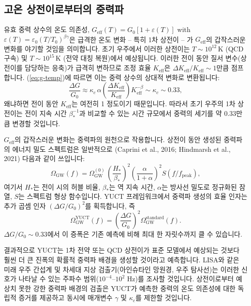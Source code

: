 \documentclass[11pt,a4paper]{article}
\newcommand{\Keff}{K_{\mathrm{eff}}}
\newcommand{\eps}{\varepsilon}
\begin{document}
	\subsection{고온 상전이로부터의 중력파}
	\label{subsec:gw}
	
	유효 중력 상수의 온도 의존성, $G_{\mathrm{eff}}(T)=G_0[1+\eps(T)]$ with $\eps(T)=\eps_0(T/T_0)^{\beta\gamma}$은 급격한 온도 변화 – 특히 1차 상전이 – 가 $G_{\mathrm{eff}}$의 갑작스러운 변화를 야기할 것임을 의미합니다. 초기 우주에서 이러한 상전이는 $T\sim 10^{12}\,\mathrm{K}$ (QCD 구속) 및 $T\sim 10^{15}\,\mathrm{K}$ (전약 대칭 복원)에서 예상됩니다. 이러한 전이 동안 질서 변수(상전이를 담당하는 응축)가 급격히 변하므로 조정 효율 $\Keff$은 $\Delta\Keff/\Keff\sim 1$만큼 점프합니다. (\ref{eq:g-temp})에 따르면 이는 중력 상수의 상대적 변화로 변환됩니다:
	\begin{equation}
		\frac{\Delta G}{G_0} \approx \kappa_c\,\alpha \left(\frac{\Delta\Keff}{\Keff}\right) 
		\Keff^{-\beta} \sim \kappa_c \sim 0.33,
		\label{eq:deltaG-phase}
	\end{equation}
	왜냐하면 전이 동안 $\Keff$는 여전히 1 정도이기 때문입니다. 따라서 초기 우주의 1차 상전이는 전이 지속 시간 $\beta_*^{-1}$과 비교할 수 있는 시간 규모에서 중력의 세기를 약 0.33만큼 변경할 것입니다.
	
	$G_{\mathrm{eff}}$의 갑작스러운 변화는 중력파의 원천으로 작용합니다. 상전이 동안 생성된 중력파의 에너지 밀도 스펙트럼은 일반적으로 (Caprini et al., 2016; Hindmarsh et al., 2021) 다음과 같이 쓰입니다:
	\begin{equation}
		\Omega_{\mathrm{GW}}(f) = \Omega_{\mathrm{GW}}^{(0)} \,
		\left(\frac{H_*}{\beta_*}\right)^2 \left(\frac{\alpha}{1+\alpha}\right)^2 
		S(f/f_{\mathrm{peak}}),
	\end{equation}
	여기서 $H_*$는 전이 시의 허블 비율, $\beta_*$는 역 지속 시간, $\alpha$는 방사선 밀도로 정규화된 잠열, $S$는 스펙트럼 형상 함수입니다. YUCT 프레임워크에서 중력파 생성의 효율 인자는 추가 곱셈 인자 $(\Delta G/G_0)^2$를 획득합니다, 즉
	\begin{equation}
		\Omega_{\mathrm{GW}}^{\mathrm{YUCT}}(f) = \left(\frac{\Delta G}{G_0}\right)^2 
		\Omega_{\mathrm{GW}}^{\mathrm{standard}}(f).
	\end{equation}
	$\Delta G/G_0\sim 0.33$에서 이 증폭은 기존 예측에 비해 최대 한 자릿수까지 클 수 있습니다.
	
	결과적으로 YUCT는 1차 전약 또는 QCD 상전이가 표준 모델에서 예상되는 것보다 훨씬 더 큰 진폭의 확률적 중력파 배경을 생성할 것이라고 예측합니다. LISA와 같은 미래 우주 간섭계 및 차세대 지상 검출기(아인슈타인 망원경, 우주 탐사선)는 이러한 신호가 나타날 수 있는 주파수 범위($10^{-4}$–$10^{2}$ Hz)를 조사할 것입니다. 상전이로부터 예상치 못한 강한 중력파 배경의 검출은 YUCT가 예측한 중력의 온도 의존성에 대한 독립적 증거를 제공하고 동시에 매개변수 $\gamma$ 및 $\kappa_c$를 제한할 것입니다.
	
\end{document}
